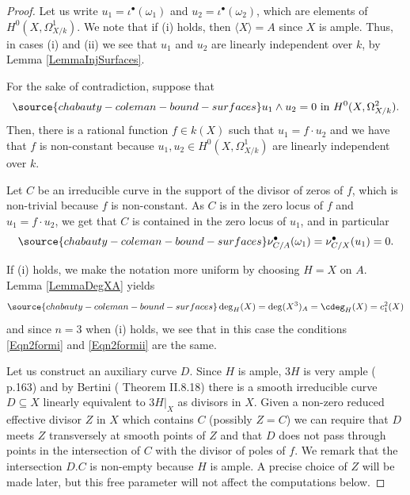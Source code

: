 \begin{proof}  Let us write $u_1=\iota^\bullet (\omega_1)$ and $u_2=\iota^\bullet (\omega_2)$, which are elements of $H^0(X,\Omega^1_{X/k})$.  We note that if (i) holds, then $\langle X\rangle=A$ since $X$ is ample. Thus, in cases (i) and (ii) we see that $u_1$ and $u_2$ are linearly independent over $k$, by Lemma \ref{LemmaInjSurfaces}.


For the sake of contradiction, suppose that
\begin{equation}\label{Eqncontr}
\source{chabauty-coleman-bound-surfaces}
u_1\wedge u_2=0 \mbox{ in } H^0(X,\Omega^2_{X/k}).
\end{equation}
Then, there is a rational function $f\in k(X)$ such that $u_1 = f \cdot u_2$ and we have that $f$ is non-constant because $u_1,u_2\in H^0(X,\Omega^1_{X/k})$ are linearly independent over $k$.

Let $C$ be an irreducible curve in the support of the divisor of zeros of $f$, which is non-trivial because $f$ is non-constant.  As $C$ is in the zero locus of $f$ and $u_1=f\cdot u_2$, we get that $C$ is contained in the zero locus of $u_1$, and in particular
\begin{equation}\label{Eqnw1int}
\source{chabauty-coleman-bound-surfaces}
\nu_{C/A}^\bullet(\omega_1)=\nu_{C/X}^\bullet(u_1)=0.
\end{equation}


If (i) holds, we make the notation more uniform by choosing $H=X$ on $A$.   Lemma \ref{LemmaDegXA} yields
\begin{equation}\label{Eqnci1}
\source{chabauty-coleman-bound-surfaces}
\deg_H(X)=\deg(X^3)_A=\cdeg_H(X)=c_1^2(X)
\end{equation}
and since $n=3$ when (i) holds, we see that in this case the conditions \eqref{Eqn2formi} and \eqref{Eqn2formii} are the same.


Let us construct an auxiliary curve $D$. Since $H$ is ample, $3H$ is very ample (\cite{Mumford} p.163) and by Bertini (\cite{Hartshorne} Theorem II.8.18) there is a smooth irreducible curve $D\subseteq X$ linearly equivalent to $3H|_X$ as divisors in $X$. Given a non-zero reduced effective divisor $Z$ in $X$ which contains $C$  (possibly $Z=C$) we can require that $D$ meets $Z$ transversely at smooth points of $Z$ and that $D$ does not pass through points in the intersection of $C$ with the divisor of poles of $f$. We remark that the intersection $D.C$ is non-empty because $H$ is ample. A precise choice of $Z$ will be made later, but this free parameter will not affect the computations below.



\end{proof}
